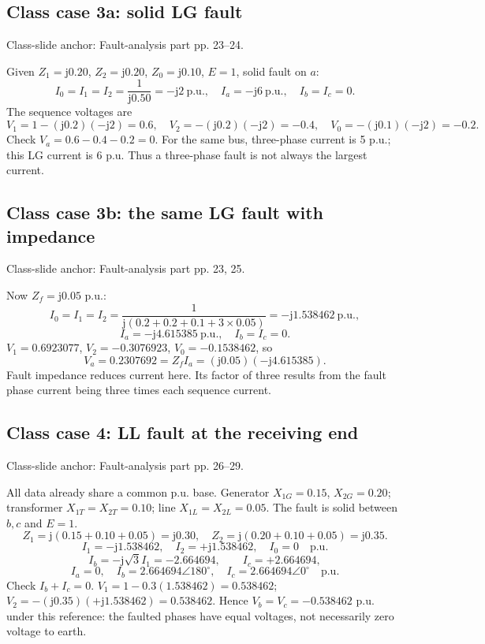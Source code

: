 \documentclass[11pt,a4paper]{article}
\newcommand{\slides}[1]{{\small\color{muted}\textsf{Class-slide anchor: #1.}}\par}
\newcommand{\ans}[1]{\boxed{#1}}
\newcommand{\jj}{\mathrm j}
\begin{document}
\subsection{Class case 3a: solid LG fault}
\slides{Fault-analysis part pp. 23--24}
Given $Z_1=\jj0.20$, $Z_2=\jj0.20$, $Z_0=\jj0.10$, $E=1$, solid fault on $a$:
\[
 \ans{I_0=I_1=I_2=\frac1{\jj0.50}=-\jj2\ \mathrm{p.u.}},\quad
 \ans{I_a=-\jj6\ \mathrm{p.u.},\quad I_b=I_c=0}.
\]
The sequence voltages are
\[
 V_1=1-(\jj0.2)(-\jj2)=0.6,\quad V_2=-(\jj0.2)(-\jj2)=-0.4,
 \quad V_0=-(\jj0.1)(-\jj2)=-0.2.
\]
Check $V_a=0.6-0.4-0.2=0$. For the same bus, three-phase current is 5 p.u.; this LG current is 6 p.u. Thus a three-phase fault is not always the largest current.
\subsection{Class case 3b: the same LG fault with impedance}
\slides{Fault-analysis part pp. 23, 25}
Now $Z_f=\jj0.05$ p.u.:
\[
 I_0=I_1=I_2=\frac1{\jj(0.2+0.2+0.1+3\times0.05)}
 =-\jj1.538462\ \mathrm{p.u.},
\]
\[
 \ans{I_a=-\jj4.615385\ \mathrm{p.u.},\quad I_b=I_c=0}.
\]
$V_1=0.6923077$, $V_2=-0.3076923$, $V_0=-0.1538462$, so
\[
 V_a=0.2307692=Z_fI_a=(\jj0.05)(-\jj4.615385).
\]
Fault impedance reduces current here. Its factor of three results from the fault phase current being three times each sequence current.
\subsection{Class case 4: LL fault at the receiving end}
\slides{Fault-analysis part pp. 26--29}
All data already share a common p.u. base. Generator $X_{1G}=0.15$, $X_{2G}=0.20$; transformer $X_{1T}=X_{2T}=0.10$; line $X_{1L}=X_{2L}=0.05$. The fault is solid between $b,c$ and $E=1$.
\[
 Z_1=\jj(0.15+0.10+0.05)=\jj0.30,\quad
 Z_2=\jj(0.20+0.10+0.05)=\jj0.35.
\]
\[
 \ans{I_1=-\jj1.538462,\quad I_2=+\jj1.538462,\quad I_0=0}\quad\mathrm{p.u.}
\]
\[
 I_b=-\jj\sqrt3I_1=-2.664694,\qquad I_c=+2.664694,
\]
\[
 \ans{I_a=0,\quad I_b=2.664694\angle180^\circ,\quad I_c=2.664694\angle0^\circ}\quad\mathrm{p.u.}
\]
Check $I_b+I_c=0$. $V_1=1-0.3(1.538462)=0.538462$; $V_2=-(\jj0.35)(+\jj1.538462)=0.538462$. Hence $V_b=V_c=-0.538462$ p.u. under this reference: the faulted phases have equal voltages, not necessarily zero voltage to earth.
\end{document}
